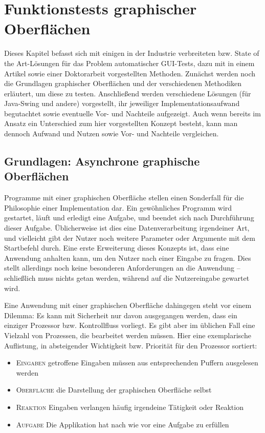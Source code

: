\chapter{Funktionstests graphischer Oberflächen}\label{chapter:introguitesting}


Dieses Kapitel befasst sich mit einigen in der Industrie verbreiteten bzw. \glqq{}State of the Art\grqq{}-Lösungen
für das Problem automatischer GUI-Tests, dazu mit in einem Artikel sowie einer Doktorarbeit
vorgestellten Methoden. Zunächst werden noch die Grundlagen graphischer Oberflächen und
der verschiedenen Methodiken erläutert, um diese zu testen.
Anschließend werden verschiedene Lösungen (für Java-Swing und andere) vorgestellt,
ihr jeweiliger Implementationsaufwand begutachtet sowie eventuelle Vor- und Nachteile aufgezeigt.
Auch wenn bereits im Ansatz ein Unterschied zum hier vorgestellten Konzept besteht, kann man dennoch
Aufwand und Nutzen sowie Vor- und Nachteile vergleichen.



\section{Grundlagen: Asynchrone graphische Oberflächen}


Programme mit einer graphischen Oberfläche stellen einen Sonderfall für
die Philosophie einer Implementation dar. Ein gewöhnliches Programm wird
gestartet, läuft und erledigt eine Aufgabe, und beendet sich nach
Durchführung dieser Aufgabe. Üblicherweise ist dies eine Datenverarbeitung
irgendeiner Art, und vielleicht gibt der Nutzer noch weitere Parameter
oder Argumente mit dem Startbefehl durch. Eine erste Erweiterung dieses
Konzepts ist, dass eine Anwendung anhalten kann, um den Nutzer nach einer
Eingabe zu fragen. Dies stellt allerdings noch keine besonderen Anforderungen
an die Anwendung -- schließlich muss nichts getan werden, während auf
die Nutzereingabe gewartet wird.

Eine Anwendung mit einer graphischen Oberfläche dahingegen steht vor
einem Dilemma: Es kann mit Sicherheit nur davon ausgegangen werden, dass ein
einziger Prozessor bzw. Kontrollfluss vorliegt. Es gibt aber im üblichen Fall
eine Vielzahl von Prozessen, die bearbeitet werden müssen. Hier eine exemplarische
Auflistung, in absteigender Wichtigkeit bzw. Priorität für den Prozessor
sortiert:

\begin{itemize}
  \item \textsc{Eingaben} getroffene Eingaben müssen aus entsprechenden Puffern ausgelesen werden
  \item \textsc{Oberfläche} die Darstellung der graphischen Oberfläche selbst
  \item \textsc{Reaktion} Eingaben verlangen häufig irgendeine Tätigkeit oder Reaktion
  \item \textsc{Aufgabe} Die Applikation hat nach wie vor eine Aufgabe zu erfüllen
\end{itemize}

